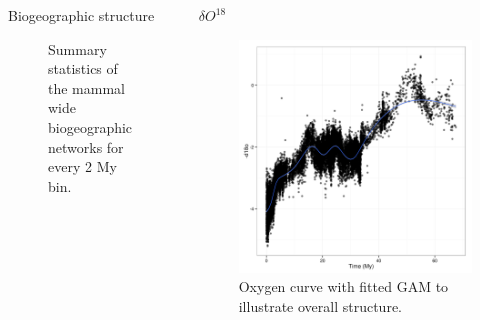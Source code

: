 \documentclass[final]{beamer}\usepackage[]{graphicx}\usepackage[]{color}
\newlength{\onecolwid}
\newlength{\twocolwid}
\begin{document}
\begin{frame}[t]
\begin{columns}[t]
\begin{column}{\twocolwid}
\begin{columns}[t,totalwidth = \twocolwid]
\begin{column}{\onecolwid}
\begin{block}{Biogeographic structure}
\begin{figure}[ht]
\begin{center}
              \end{center}
              \caption{Summary statistics of the mammal wide biogeographic networks for every 2 My bin.}
              \label{fig:net_gen}
            \end{figure}

          \end{block}
        \end{column}

        \begin{column}{\onecolwid}
          \begin{block}{\(\delta O^{18}\)}
            \begin{figure}[ht]
              \centering
              \includegraphics[height = 0.2\textheight]{figure/zachos}
              \caption{Oxygen curve \citep{Zachos2008} with fitted GAM to illustrate overall structure.}
              \label{fig:zac}
            \end{figure}
          \end{block}
        \end{column}
      \end{columns}


\end{column}
\end{columns}
\end{frame}
\end{document}
